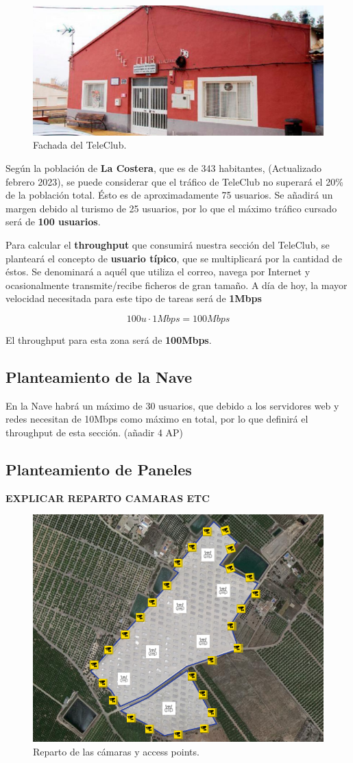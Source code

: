 \documentclass{article}
\begin{document}
\quad

\begin{figure}[ht]
    \centering
    \includegraphics[width=0.5\linewidth]{src/teleclub.jpg}
    \caption{\label{fig:teleclub} Fachada del TeleClub.}
\end{figure}


Según la población de \textbf{La Costera}, que es de 343 habitantes, (Actualizado febrero 2023), se puede considerar que el tráfico de TeleClub no superará el 20\% de la población total. Ésto es de aproximadamente 75 usuarios. Se añadirá un margen debido al turismo de 25 usuarios, por lo que el máximo tráfico cursado será de \textbf{100 usuarios}.

\quad

Para calcular el \textbf{throughput} que consumirá nuestra sección del TeleClub, se planteará el concepto de \textbf{usuario típico}, que se multiplicará por la cantidad de éstos. Se denominará a aquél que utiliza el correo, navega por Internet y ocasionalmente transmite/recibe ficheros de gran tamaño. A día de hoy, la mayor velocidad necesitada para este tipo de tareas será de \textbf{1Mbps}

    $$100u \cdot 1Mbps = 100Mbps$$

El throughput para esta zona será de \textbf{100Mbps}.

\subsection{Planteamiento de la Nave}

En la Nave habrá un máximo de 30 usuarios, que debido a los servidores web y redes necesitan de 10Mbps como máximo en total, por lo que definirá el throughput de esta sección. (añadir 4 AP)

\subsection{Planteamiento de Paneles}

\textbf{EXPLICAR REPARTO CAMARAS ETC}
\begin{figure}[ht]
    \centering
    \includegraphics[width=0.4\linewidth]{src/camaras.png}
    \caption{\label{fig:camarasnave} Reparto de las cámaras y access points.}
\end{figure}
\end{document}
